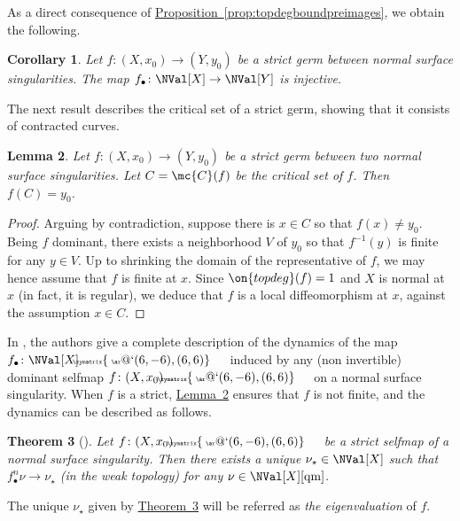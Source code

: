\documentclass[11 pt, twoside, a4paper]{amsart}
\makeatletter
\newcommand{\selfarrow}[1][]{\tiny{\!\!\!\xymatrix{\phantom{|}\ar@`{(6,-6),(6,6)}}\hspace{4mm}}}
\newtheorem{thm}{Theorem}[section]
\newtheorem{lem}[thm]{Lemma}
\newtheorem{cor}[thm]{Corollary}
\theoremstyle{definition}
\theoremstyle{definition}
\newcommand{\Crit}[1]{\mc{C}(#1)} %
\newcommand{\refprop}[1]{\hyperref[prop:#1]{Proposition~\ref*{prop:#1}}}
\newcommand{\refthm}[1]{\hyperref[thm:#1]{Theorem~\ref*{thm:#1}}}
\newcommand{\reflem}[1]{\hyperref[lem:#1]{Lemma~\ref*{lem:#1}}}
\makeatother
\begin{document}
As a direct consequence of \refprop{topdegboundpreimages}, we obtain the following.

\begin{cor}\label{cor:strictvalinj}
Let $f \colon (X,x_0) \to (Y,y_0)$ be a strict germ between normal surface singularities. The map $f_\bullet \colon \NVal[X] \to \NVal[Y]$ is injective.
\end{cor}

The next result describes the critical set of a strict germ, showing that it consists of contracted curves.

\begin{lem}\label{lem:imagecrit2dstrict}
Let $f \colon (X,x_0) \to (Y,y_0)$ be a strict germ between two normal surface singularities.
Let $C=\Crit{f}$ be the critical set of $f$. Then $f(C)=y_0$.
\end{lem}
\begin{proof}
Arguing by contradiction, suppose there is $x \in C$ so that $f(x) \neq y_0$.
Being $f$ dominant, there exists a neighborhood $V$ of $y_0$ so that $f^{-1}(y)$ is finite for any $y \in V$.
Up to shrinking the domain of the representative of $f$, we may hence assume that $f$ is finite at $x$.
Since $\on{topdeg}(f)=1$ and $X$ is normal at $x$ (in fact, it is regular), we deduce that $f$ is a local diffeomorphism at $x$, against the assumption $x \in C$.
\end{proof}

In \cite{gignac-ruggiero:locdynnoninvnormsurfsing}, the authors give a complete description of the dynamics of the map $f_\bullet \colon \NVal[X] \selfarrow$ induced by any (non invertible) dominant selfmap $f \colon (X,x_0) \selfarrow$ on a normal surface singularity.
When $f$ is a strict, \reflem{imagecrit2dstrict} ensures that $f$ is not finite, and the dynamics can be described as follows.

\begin{thm}[{\cite[Theorem B]{gignac-ruggiero:locdynnoninvnormsurfsing}}]\label{thm:strictvaldyn}
Let $f \colon (X,x_0) \selfarrow$ be a strict selfmap of a normal surface singularity.
Then there exists a unique $\nu_\star \in \NVal[X]$ such that $f_\bullet^n \nu \to \nu_\star$ (in the weak topology) for any $\nu \in \NVal[X][\mathrm{qm}]$.
\end{thm}
The unique $\nu_\star$ given by \refthm{strictvaldyn} will be referred as \emph{the eigenvaluation} of $f$.
\end{document}
